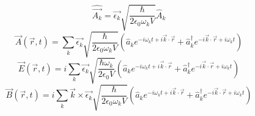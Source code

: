 \documentclass[9pt]{article}
\begin{document}
\begin{equation}
    \hat{\vec{A_k}}=\vec{\epsilon_k}\sqrt{\frac{\hbar}{2\epsilon_0\omega_k V}}\hat{A}_k
\end{equation}
\begin{equation}
    \vec{A}(\vec{r},t)=\sum_k\vec{\epsilon_k}\sqrt{\frac{\hbar}{2\epsilon_0\omega_k V}}(\hat{a}_k e^{-i\omega_k t + i\vec{k}\cdot\vec{r}}+
    \hat{a}_k^\dagger e^{-i\vec{k}\cdot\vec{r} + i\omega_k t})
\end{equation}
\begin{equation}
    \vec{E}(\vec{r},t)=i\sum_k\vec{\epsilon_k}\sqrt{\frac{\hbar\omega_k}{2\epsilon_0 V}}(\hat{a}_k e^{-i\omega_k t + i\vec{k}\cdot\vec{r}}+
    \hat{a}_k^\dagger e^{-i\vec{k}\cdot\vec{r} + i\omega_k t})
\end{equation}
\begin{equation}
    \vec{B}(\vec{r},t)=i\sum_k\vec{k}\times\vec{\epsilon_k}\sqrt{\frac{\hbar}{2\epsilon_0\omega_k V}}(\hat{a}_k e^{-i\omega_k t + i\vec{k}\cdot\vec{r}}+
    \hat{a}_k^\dagger e^{-i\vec{k}\cdot\vec{r} + i\omega_k t})
\end{equation}
\end{document}
